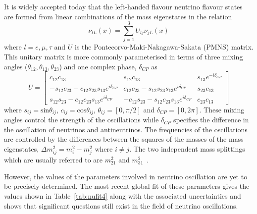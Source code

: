 It is widely accepted today that the left-handed flavour neutrino flavour states are formed from linear combinations of the mass eigenstates in the relation
\begin{equation}
  \nu_{lL}(x) = \sum_{j=1}^{3} U_{lj} \nu_{jL}(x)
\end{equation}
where $l = e, \mu, \tau$ and $U$ is the Pontecorvo-Maki-Nakagawa-Sakata (PMNS) matrix.
This unitary matrix is more commonly parameterised in terms of three mixing angles ($\theta_{12}, \theta_{13}, \theta_{23}$) and one complex phase, $\delta_{CP}$ as
\begin{equation}
  U =
  \begin{bmatrix}
    c_{12}c_{13} & s_{12}c_{13} & s_{13} e^{-i\delta_{CP}} \\
    -s_{12}c_{23}-c_{12}s_{23}s_{13}e^{i\delta_{CP}} & c_{12}c_{23}-s_{12}s_{23}s_{13}e^{i\delta_{CP}} & s_{23}c_{13} \\
    s_{12}s_{23}-c_{12}c_{23}s_{13}e^{i\delta_{CP}} & -c_{12}s_{23}-s_{12}c_{23}s_{13}e^{i\delta_{CP}} & c_{23}c_{13}
  \end{bmatrix}
\end{equation}
where $s_{ij} = \text{sin}\theta_{ij}$, $c_{ij} = \text{cos}\theta_{ij}$, $\theta_{ij} = [0, \pi/2]$ and $\delta_{CP} = [0, 2\pi]$.
These mixing angles control the strength of the oscillations while $\delta_{CP}$ specifies the difference in the oscillation of neutrinos and antineutrinos.
The frequencies of the oscillations are controlled by the differences between the squares of the masses of the mass eigenstates, $\Delta m_{ij}^{2} = m_{i}^{2} - m_{j}^{2}$ where $i \neq j$.
The two independent mass splittings which are usually referred to are $m^{2}_{21}$ and $m^{2}_{31}$~\cite{pdg2018}.

However, the values of the parameters involved in neutrino oscillation are yet to be precisely determined.
The most recent global fit of these parameters gives the values shown in Table~\ref{tab:nufit4} along with the associated uncertainties and shows that significant questions still exist in the field of neutrino oscillations.

